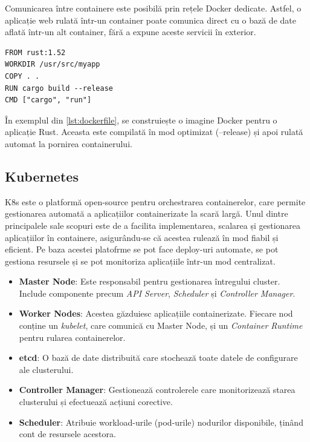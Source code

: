 \documentclass[titlepage,12pt]{article}
\DeclareRobustCommand{\code}[1]{{\ttfamily\small #1}}
\begin{document}
Comunicarea între containere este posibilă prin rețele Docker dedicate.
Astfel, o aplicație web rulată într-un container poate comunica direct cu o bază de date aflată într-un alt container, fără a expune aceste servicii în exterior.

\begin{lstlisting}[language=docker,caption={Exemplu Dockerfile},label={lst:dockerfile}]
FROM rust:1.52
WORKDIR /usr/src/myapp
COPY . .
RUN cargo build --release
CMD ["cargo", "run"]
\end{lstlisting}

În exemplul din \cref{lst:dockerfile}, se construiește o imagine Docker pentru o aplicație Rust.
Aceasta este compilată în mod optimizat (\code{--release}) și apoi rulată automat la pornirea containerului.

\subsection{Kubernetes}

\ac {K8s} este o platformă open-source pentru orchestrarea containerelor, care permite gestionarea automată a aplicațiilor containerizate la scară largă. Unul dintre principalele sale scopuri este de a facilita implementarea, scalarea și gestionarea aplicațiilor în containere, asigurându-se că acestea rulează în mod fiabil și eficient.
Pe baza acestei platofrme se pot face deploy-uri automate, se pot gestiona resursele și se pot monitoriza aplicațiile într-un mod centralizat.

\begin{itemize}
\item \textbf{Master Node}: Este responsabil pentru gestionarea întregului cluster. Include componente precum \textit{API Server}, \textit{Scheduler} și \textit{Controller Manager}.
\item \textbf{Worker Nodes}: Acestea găzduiesc aplicațiile containerizate. Fiecare nod conține un \textit{kubelet}, care comunică cu Master Node, și un \textit{Container Runtime} pentru rularea containerelor.
\item \textbf{etcd}: O bază de date distribuită care stochează toate datele de configurare ale clusterului.
\item \textbf{Controller Manager}: Gestionează controlerele care monitorizează starea clusterului și efectuează acțiuni corective.
\item \textbf{Scheduler}: Atribuie workload-urile (pod-urile) nodurilor disponibile, ținând cont de resursele acestora.
\end{itemize}
\end{document}
